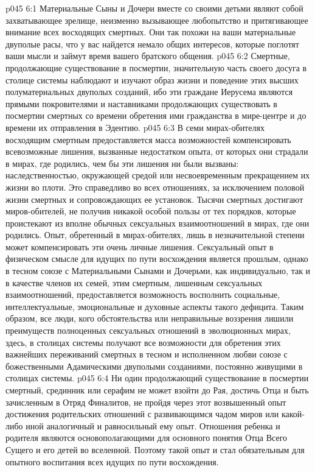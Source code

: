 \vs p045 6:1 Материальные Сыны и Дочери вместе со своими детьми являют собой захватывающее зрелище, неизменно вызывающее любопытство и притягивающее внимание всех восходящих смертных. Они так похожи на ваши материальные двуполые расы, что у вас найдется немало общих интересов, которые поглотят ваши мысли и займут время вашего братского общения.
\vs p045 6:2 Смертные, продолжающие существование в посмертии, значительную часть своего досуга в столице системы наблюдают и изучают образ жизни и поведение этих высших полуматериальных двуполых созданий, ибо эти граждане Иерусема являются прямыми покровителями и наставниками продолжающих существовать в посмертии смертных со времени обретения ими гражданства в мире\hyp{}центре и до времени их отправления в Эдентию.
\vs p045 6:3 В семи мирах\hyp{}обителях восходящим смертным предоставляется масса возможностей компенсировать всевозможные лишения, вызванные недостатком опыта, от которых они страдали в мирах, где родились, чем бы эти лишения ни были вызваны: наследственностью, окружающей средой или несвоевременным прекращением их жизни во плоти. Это справедливо во всех отношениях, за исключением половой жизни смертных и сопровождающих ее установок. Тысячи смертных достигают миров\hyp{}обителей, не получив никакой особой пользы от тех порядков, которые проистекают из вполне обычных сексуальных взаимоотношений в мирах, где они родились. Опыт, обретенный в мирах\hyp{}обителях, лишь в незначительной степени может компенсировать эти очень личные лишения. Сексуальный опыт в физическом смысле для идущих по пути восхождения является прошлым, однако в тесном союзе с Материальными Сынами и Дочерьми, как индивидуально, так и в качестве членов их семей, этим смертным, лишенным сексуальных взаимоотношений, предоставляется возможность восполнить социальные, интеллектуальные, эмоциональные и духовные аспекты такого дефицита. Таким образом, все люди, кого обстоятельства или неправильные воззрения лишили преимуществ полноценных сексуальных отношений в эволюционных мирах, здесь, в столицах системы получают все возможности для обретения этих важнейших переживаний смертных в тесном и исполненном любви союзе с божественными Адамическими двуполыми созданиями, постоянно живущими в столицах системы.
\vs p045 6:4 \pc Ни один продолжающий существование в посмертии смертный, срединник или серафим не может взойти до Рая, достичь Отца и быть зачисленным в Отряд Финалитов, не пройдя через этот возвышенный опыт достижения родительских отношений с развивающимся чадом миров или какой\hyp{}либо иной аналогичный и равносильный ему опыт. Отношения ребенка и родителя являются основополагающими для основного понятия Отца Всего Сущего и его детей во вселенной. Поэтому такой опыт и стал обязательным для опытного воспитания всех идущих по пути восхождения.
